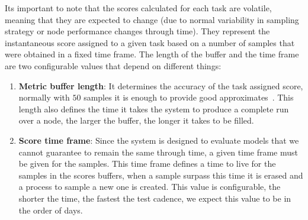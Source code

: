 Its important to note that the scores calculated for each task are volatile, meaning that they are expected to change (due to normal variability in sampling strategy or node performance changes through time). They represent the instantaneous score assigned to a given task based on a number of samples that were obtained in a fixed time frame. The length of the buffer and the time frame are two configurable values that depend on different things:
\begin{enumerate}
    \item \textbf{Metric buffer length}: It determines the accuracy of the task assigned score, normally with $50$ samples it is enough to provide good approximates~\cite{polo2024tinybenchmarks}. This length also defines the time it takes the system to produce a complete run over a node, the larger the buffer, the longer it takes to be filled.
    \item \textbf{Score time frame}: Since the system is designed to evaluate models that we cannot guarantee to remain the same through time, a given time frame must be given for the samples. This time frame defines a time to live for the samples in the scores buffers, when a sample surpass this time it is erased and a process to sample a new one is created. This value is configurable, the shorter the time, the fastest the test cadence, we expect this value to be in the order of days.
\end{enumerate}